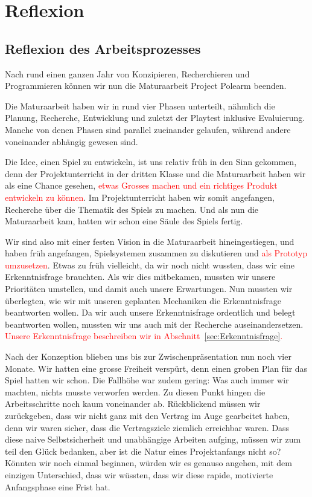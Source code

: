 \documentclass[../Main.tex]{subfiles}
\begin{document}
\section{Reflexion} \label{sec:Reflexion}

\subsection{Reflexion des Arbeitsprozesses}

Nach rund einen ganzen Jahr von Konzipieren, Recherchieren und Programmieren können wir nun die Maturaarbeit Project Polearm beenden.

Die Maturaarbeit haben wir in rund vier Phasen unterteilt, nähmlich die Planung, Recherche, Entwicklung und zuletzt der Playtest inklusive Evaluierung. Manche von denen Phasen sind parallel zueinander gelaufen, während andere voneinander abhängig gewesen sind.

Die Idee, einen Spiel zu entwickeln, ist uns relativ früh in den Sinn gekommen, denn der Projektunterricht in der dritten Klasse und die Maturaarbeit haben wir als eine Chance gesehen, \textcolor{red}{etwas Grosses machen und ein richtiges Produkt entwickeln zu können}. Im Projektunterricht haben wir somit angefangen, Recherche über die Thematik des Spiels zu machen. Und als nun die Maturaarbeit kam, hatten wir schon eine Säule des Spiels fertig.

Wir sind also mit einer festen Vision in die Maturaarbeit hineingestiegen, und haben früh angefangen, Spielsystemen zusammen zu diskutieren und \textcolor{red}{als Prototyp umzusetzen}. Etwas zu früh vielleicht, da wir noch nicht wussten, dass wir eine Erkenntnisfrage brauchten. Als wir dies mitbekamen, mussten wir unsere Prioritäten umstellen, und damit auch unsere Erwartungen. Nun mussten wir überlegten, wie wir mit unseren geplanten Mechaniken die Erkenntnisfrage beantworten wollen.  Da wir auch unsere Erkenntnisfrage ordentlich und belegt beantworten wollen, mussten wir uns auch mit der Recherche auseinandersetzen.\textcolor{red}{ Unsere Erkenntnisfrage beschreiben wir in Abschnitt~\ref{sec:Erkenntnisfrage}.}

Nach der Konzeption blieben uns bis zur Zwischenpräsentation nun noch vier Monate. Wir hatten eine grosse Freiheit verspürt, denn einen groben Plan für das Spiel hatten wir schon. Die Fallhöhe war zudem gering: Was auch immer wir machten, nichts musste verworfen werden. Zu diesen Punkt hingen die Arbeitsschritte noch kaum voneinander ab. Rückblickend müssen wir zurückgeben, dass wir nicht ganz mit den Vertrag im Auge gearbeitet haben, denn wir waren sicher, dass die Vertragsziele ziemlich erreichbar waren. Dass diese naive Selbstsicherheit und unabhängige Arbeiten aufging, müssen wir zum teil den Glück bedanken, aber ist die Natur eines Projektanfangs nicht so? Könnten wir noch einmal beginnen, würden wir es genauso angehen, mit dem einzigen Unterschied, dass wir wüssten, dass wir diese rapide, motivierte Anfangsphase eine Frist hat.
\end{document}
